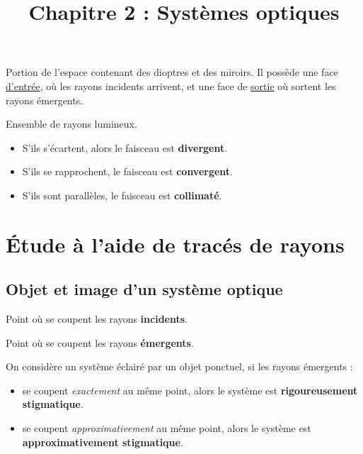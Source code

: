 \documentclass[11pt]{article}
\title{Chapitre 2 : Systèmes optiques}
\author{}
\date{}
\theoremstyle{cstyle}{\newtheorem{definition}{Définition}[section]}
\theoremstyle{cstyle}{\newtheorem{proposition}[definition]{Propriété}}
\theoremstyle{cstyle}{\newtheorem{theorem}[definition]{Théorème}}
\theoremstyle{mystyle}{\newtheorem{lemma}[definition]{Lemme}}
\theoremstyle{mystyle}{\newtheorem{corollary}[definition]{Corollaire}}
\theoremstyle{mystyle}{\newtheorem*{remark}{Remarque}}
\theoremstyle{mystyle}{\newtheorem*{remarks}{Remarques}}
\theoremstyle{mystyle}{\newtheorem*{example}{Exemple}}
\theoremstyle{mystyle}{\newtheorem*{examples}{Exemples}}
\theoremstyle{definition}{\newtheorem*{exercise}{Exercice}}
\theoremstyle{mystyle}{\newtheorem*{methode}{Méthode}}
\theoremstyle{cstyle}{\newtheorem*{cthm}{}}
\theoremstyle{warn}
\begin{document}
	
	\maketitle
	
	\begin{minipage}[t]{0.46\textwidth}
		\begin{definition}
			Portion de l'espace contenant des dioptres et des miroirs. Il possède une face \underline{d'entrée}, où les rayons incidents arrivent, et une face de \underline{sortie} où sortent les rayons émergents.
		\end{definition}
	
		\begin{definition}
			Ensemble de rayons lumineux. 
			\begin{itemize}
				\item S'ils s'écartent, alors le faisceau est \textbf{divergent}.
				\item S'ils se rapprochent, le faisceau est \textbf{convergent}.
				\item S'ils sont parallèles, le faisceau est \textbf{collimaté}.
			\end{itemize}
		\end{definition}
	
		\section{Étude à l'aide de tracés de rayons}
		\subsection{Objet et image d'un système optique}
		
		\begin{definition} 
			Point où se coupent les rayons \textbf{incidents}.
		\end{definition}
	
		\begin{definition}
			Point où se coupent les rayons \textbf{émergents}.
		\end{definition}
	
		\begin{definition}[Stigmatisme]
			On considère un système éclairé par un objet ponctuel, si les rayons émergents :
			\begin{itemize}
				\item se coupent \textit{exactement} au même point, alors le système est \textbf{rigoureusement stigmatique}.
				\item se coupent \textit{approximativement} au même point, alors le système est \textbf{approximativement stigmatique}.
			\end{itemize}
		\end{definition}
	\end{minipage}
\end{document}

